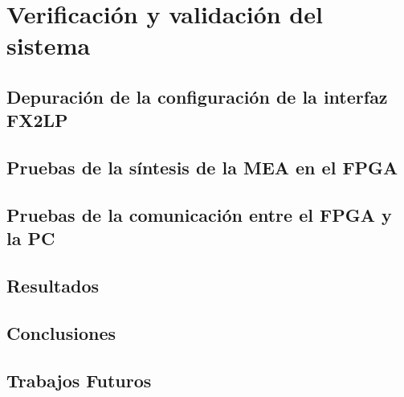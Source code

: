 \chapter{Verificación y validación del sistema}
	\label{cap:verif}
	
	\section{Depuración de la configuración de la interfaz FX2LP}
		
	\section{Pruebas de la síntesis de la MEA en el FPGA}
		
	\section{Pruebas de la comunicación entre el FPGA y la PC}
		
	\section{Resultados}
		
	\section{Conclusiones}
		
	\section{Trabajos Futuros}
		